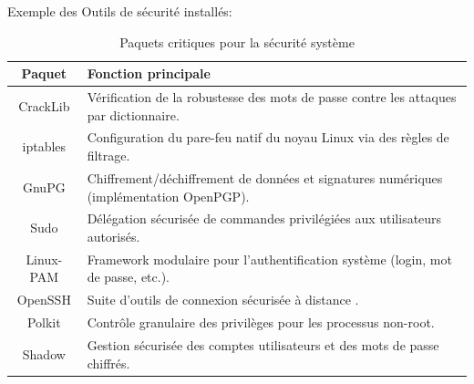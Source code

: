 Exemple des Outils de sécurité installés:
\begin{table}[H]
    \centering
    \begin{tabular}{|c|p{8cm}|}
        \hline
        \textbf{Paquet}  & \textbf{Fonction principale} \\
        \hline
       
        CrackLib  & Vérification de la robustesse des mots de passe contre les attaques par dictionnaire. \\
        \hline
        iptables  & Configuration du pare-feu natif du noyau Linux via des règles de filtrage. \\
        \hline
        GnuPG  & Chiffrement/déchiffrement de données et signatures numériques (implémentation OpenPGP). \\
        \hline
        Sudo  & Délégation sécurisée de commandes privilégiées aux utilisateurs autorisés. \\
        \hline
        Linux-PAM & Framework modulaire pour l'authentification système (login, mot de passe, etc.). \\
        \hline
        OpenSSH  & Suite d'outils de connexion sécurisée à distance . \\
        \hline
        Polkit  & Contrôle granulaire des privilèges pour les processus non-root. \\
        \hline
        Shadow  & Gestion sécurisée des comptes utilisateurs et des mots de passe chiffrés. \\
        \hline
    \end{tabular}
    \caption{Paquets critiques pour la sécurité système}
    \label{tab:security_packages}
\end{table}
 
